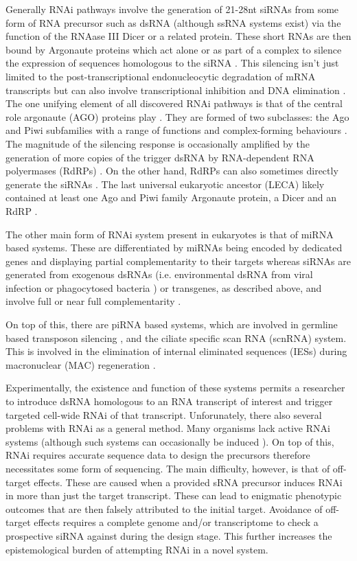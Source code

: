 Generally RNAi pathways involve the generation of 21-28nt siRNAs
from some form of RNA precursor such as dsRNA (although ssRNA systems exist)
via the function of the RNAase III Dicer \citep{Bernstein2001} or a related protein. 
These short RNAs are then bound by Argonaute proteins which act alone or as part
of a complex to silence the expression of sequences homologous to the siRNA \citep{Ketting2011}.
This silencing isn't just limited to the post-transcriptional endonucleocytic degradation of 
mRNA transcripts but can also involve transcriptional inhibition and
DNA elimination \citep{Marker2014}.
The one unifying element of all discovered RNAi pathways is that
of the central role argonaute (AGO) proteins play \citep{Ketting2011}.
They are formed of two subclasses: the Ago and Piwi subfamilies \citep{Peters2007}
with a range of functions and complex-forming behaviours
\citep{Ender2010}.
The magnitude of the silencing response is occasionally amplified by the generation
of more copies of the trigger dsRNA by RNA-dependent RNA polyermases (RdRPs) \citep{Arp2007}.
On the other hand, RdRPs can also sometimes directly generate the siRNAs \citep{Aoki2007,Ketting2011}.
The last universal eukaryotic ancestor (LECA) likely contained 
at least one Ago and Piwi family Argonaute protein, a Dicer and an RdRP \citep{Cerutti2006}.

The other main form of RNAi system present in eukaryotes is that of 
miRNA based systems.  These are differentiated
by miRNAs being encoded by dedicated genes and displaying partial
complementarity to their targets whereas siRNAs are generated from exogenous
dsRNAs (i.e. environmental dsRNA from viral infection or phagocytosed bacteria \citep{Whangbo2008})
or transgenes, as described above, and involve full or near full complementarity \citep{Shabalina2008}.

On top of this, there are piRNA based systems, which are involved in germline based transposon 
silencing \citep{Iwasaki2015}, and the ciliate specific scan RNA (scnRNA) system.
This is involved in the elimination of internal eliminated sequences (IESs) during
macronuclear (MAC) regeneration \citep{Mochizuki2004,Kiefer2013}.


Experimentally, the existence and function of these systems
permits a researcher to introduce dsRNA homologous to an RNA transcript of interest
and trigger targeted cell-wide RNAi of that transcript.
Unforunately, there also several problems with RNAi as a general method.
Many organisms lack active RNAi systems (although such systems can occasionally
be induced \citep{Alibu2005}).
On top of this, RNAi requires accurate sequence data to design the precursors
therefore necessitates some form of sequencing. 
The main difficulty, however, is that of off-target effects.
These are caused when a provided sRNA precursor induces RNAi
in more than just the target transcript.  These
can lead to enigmatic phenotypic outcomes that 
are then falsely attributed to the initial target.
Avoidance of off-target effects 
requires a complete genome and/or transcriptome
to check a prospective siRNA against during the design
stage.  This further increases the epistemological
burden of attempting RNAi in a novel system.

